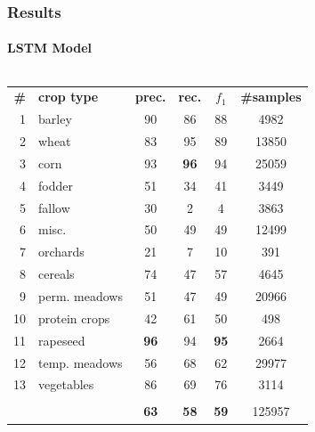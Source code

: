 \documentclass[%
  aspectratio=169,
  9pt,
  USenglish,
  titlegraphic, %
  affiliationintitlepagehead,
  affiliation,
]{beamer}
\begin{document}
\begin{frame}
	\frametitle{Results}
	\framesubtitle{LSTM Model}
	\small
	\begin{columns}
		
		\begin{tabular}{rlcccc}
			\toprule
			\textbf{\#} & \textbf{crop type} &  \textbf{prec.} & \textbf{rec.} & \textbf{$f_1$} & \textbf{\#samples} \\
			\cmidrule(lr){1-1}\cmidrule(lr){2-2}\cmidrule(lr){3-3}\cmidrule(lr){4-4}\cmidrule(lr){5-5}\cmidrule(lr){6-6}
			1 & barley &         90 &          86 &          88 &     4982 \\
			2 & wheat &         83 &          95 &          89 &    13850 \\
			3 & corn &         93 &          \textbf{96} &          94 &    25059 \\
			4 & fodder &         51 &          34 &          41 &     3449 \\
			5 & fallow &         30 &           2 &           4 &     3863 \\
			6 & misc. &         50 &          49 &          49 &    12499 \\
			7 & orchards &         21 &           7 &          10 &      391 \\
			8 & cereals &         74 &          47 &          57 &     4645 \\
			9 & perm. meadows &         51 &          47 &          49 &    20966 \\
			10 & protein crops &         42 &          61 &          50 &      498 \\
			11 & rapeseed &         \textbf{96} &          94 &          \textbf{95} &     2664 \\
			12 & temp. meadows &         56 &          68 &          62 &    29977 \\
			13 & vegetables &         86 &          69 &          76 &     3114 \\
			&                       &            &             &             &          \\
			&                       &         \textbf{63} &          \textbf{58} &          \textbf{59} &   125957 \\
			\bottomrule
		\end{tabular}
		
		
		
	\end{columns}
\end{frame}
\end{document}

